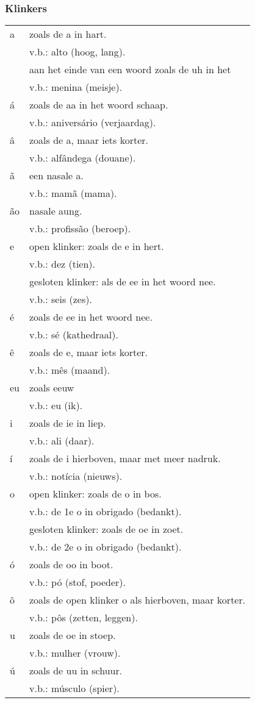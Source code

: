 \subsubsection*{Klinkers}
\begin{longtable}{p{} p{}}
a & zoals de a in hart.\\
 & v.b.: alto (hoog, lang).\\
& aan het einde van een woord zoals de uh in het\\
  & v.b.: menina (meisje).\\
á & zoals de aa in het woord schaap.\\
 & v.b.: aniversário (verjaardag).\\
â & zoals de a, maar iets korter.\\
 & v.b.: alfândega (douane).\\
ã & een nasale a.\\
 & v.b.: mamã (mama).\\
ão & nasale aung.\\
 & v.b.: profissão (beroep).\\
e & open klinker: zoals de e in hert.\\
 & v.b.: dez (tien).\\
 & gesloten klinker: als de ee in het woord nee.\\
 & v.b.: seis (zes).\\
é & zoals de ee in het woord nee.\\
& v.b.: sé (kathedraal).\\
ê & zoals de e, maar iets korter.\\
 & v.b.: mês (maand).\\
eu & zoals eeuw\\
 & v.b.: eu (ik).\\
i & zoals de ie in liep.\\
 & v.b.: ali (daar).\\
í & zoals de i hierboven, maar met meer nadruk.\\
 & v.b.: notícia (nieuws).\\
o & open klinker: zoals de o in bos.\\
 & v.b.: de 1e o in obrigado (bedankt).\\
& gesloten klinker: zoals de oe in zoet.\\
 & v.b.: de 2e o in obrigado (bedankt).\\
ó & zoals de oo in boot.\\
 & v.b.: pó (stof, poeder).\\
ô & zoals de open klinker o als hierboven, maar korter.\\
 & v.b.: pôs (zetten, leggen).\\
u & zoals de oe in stoep.\\
 & v.b.: mulher (vrouw).\\
ú & zoals de uu in schuur.\\
 & v.b.: músculo (spier).\\
\end{longtable}